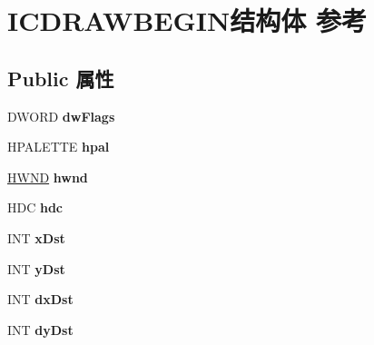 \hypertarget{struct_i_c_d_r_a_w_b_e_g_i_n}{}\section{I\+C\+D\+R\+A\+W\+B\+E\+G\+I\+N结构体 参考}
\label{struct_i_c_d_r_a_w_b_e_g_i_n}
\subsection*{Public 属性}
\begin{DoxyCompactItemize}
\item 
\mbox{\label{struct_i_c_d_r_a_w_b_e_g_i_n_aac1113cae2ac516791145e6a46131fe0}} 
D\+W\+O\+RD {\bfseries dw\+Flags}
\item 
\mbox{\label{struct_i_c_d_r_a_w_b_e_g_i_n_a8e3ee216b61e56cbd6abb07c905ed7a6}} 
H\+P\+A\+L\+E\+T\+TE {\bfseries hpal}
\item 
\mbox{\label{struct_i_c_d_r_a_w_b_e_g_i_n_ab4842e932a29ceb43d55e55a12cfbbaa}} 
\hyperlink{interfacevoid}{H\+W\+ND} {\bfseries hwnd}
\item 
\mbox{\label{struct_i_c_d_r_a_w_b_e_g_i_n_a5071d08ab8269e9549a9ca9142d6d8d8}} 
H\+DC {\bfseries hdc}
\item 
\mbox{\label{struct_i_c_d_r_a_w_b_e_g_i_n_af15f643e79a62bd8634c71ded04b76bf}} 
I\+NT {\bfseries x\+Dst}
\item 
\mbox{\label{struct_i_c_d_r_a_w_b_e_g_i_n_a21def5e35d21e05a05712f353fa3c834}} 
I\+NT {\bfseries y\+Dst}
\item 
\mbox{\label{struct_i_c_d_r_a_w_b_e_g_i_n_a7ffe56ac4890be9125187f7aa7d99bc2}} 
I\+NT {\bfseries dx\+Dst}
\item 
\mbox{\label{struct_i_c_d_r_a_w_b_e_g_i_n_a1c7c3965cc66c2a565ce05e31d06fbf4}} 
I\+NT {\bfseries dy\+Dst}
\item 
\mbox{\label{struct_i_c_d_r_a_w_b_e_g_i_n_a7356a5e94b35f1a0b2df98221cb38781}} 

\end{DoxyCompactItemize}
